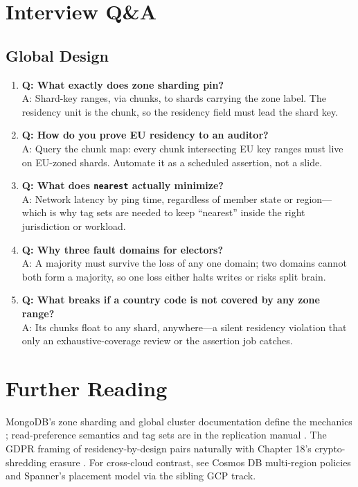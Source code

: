 \section{Interview Q\&A}
\subsection{Global Design}
\begin{enumerate}
    \item \textbf{Q: What exactly does zone sharding pin?}\\
    A: Shard-key ranges, via chunks, to shards carrying the zone label. The residency unit is the chunk, so the residency field must lead the shard key.

    \item \textbf{Q: How do you prove EU residency to an auditor?}\\
    A: Query the chunk map: every chunk intersecting EU key ranges must live on EU-zoned shards. Automate it as a scheduled assertion, not a slide.

    \item \textbf{Q: What does \texttt{nearest} actually minimize?}\\
    A: Network latency by ping time, regardless of member state or region---which is why tag sets are needed to keep ``nearest'' inside the right jurisdiction or workload.

    \item \textbf{Q: Why three fault domains for electors?}\\
    A: A majority must survive the loss of any one domain; two domains cannot both form a majority, so one loss either halts writes or risks split brain.

    \item \textbf{Q: What breaks if a country code is not covered by any zone range?}\\
    A: Its chunks float to any shard, anywhere---a silent residency violation that only an exhaustive-coverage review or the assertion job catches.
\end{enumerate}

\section{Further Reading}
MongoDB's zone sharding and global cluster documentation define the mechanics \cite{mongodbZoneShardingDocs,mongodbGlobalClustersDocs}; read-preference semantics and tag sets are in the replication manual \cite{mongodbReadPreferenceDocs,mongodbReplicationDocs}. The GDPR framing of residency-by-design pairs naturally with Chapter 18's crypto-shredding erasure \cite{mongodbQueryableEncryptionDocs}. For cross-cloud contrast, see Cosmos DB multi-region policies \cite{cosmosPartitionDocs} and Spanner's placement model via the sibling GCP track.

